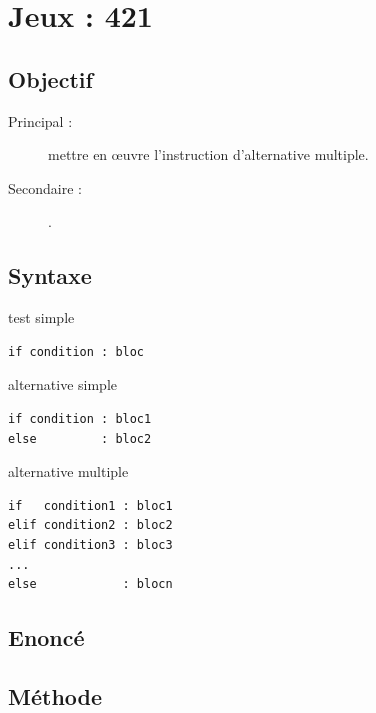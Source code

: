 \section{Jeux : 421}

\subsection{Objectif}\label{tests:jeux:objectif}
\begin{description}
\item[Principal : ] mettre en \oe uvre l'instruction d'alternative multiple.
\item[Secondaire :] .
\end{description}

\subsection{Syntaxe \python}\label{tests:jeux:python}
\noindent\begin{minipage}[t]{0.3\textwidth}
test simple\footnotesize
\begin{Verbatim}
if condition : bloc
\end{Verbatim}
\end{minipage}
\hfill
\begin{minipage}[t]{0.3\textwidth}
alternative simple\footnotesize
\begin{Verbatim}
if condition : bloc1
else         : bloc2
\end{Verbatim}
\end{minipage}
\hfill
\begin{minipage}[t]{0.3\textwidth}
alternative multiple\footnotesize
\begin{Verbatim}
if   condition1 : bloc1
elif condition2 : bloc2
elif condition3 : bloc3
...
else            : blocn
\end{Verbatim}
\end{minipage}

\subsection{Enoncé}\label{tests:jeux:enonce}

\subsection{Méthode}\label{tests:jeux:methode}

